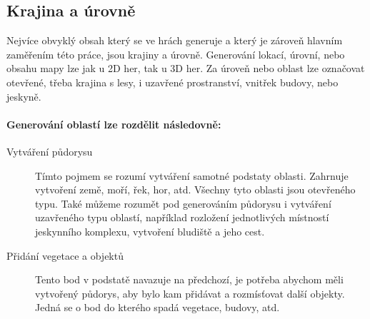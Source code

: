 \subsection{Krajina a úrovně}
Nejvíce obvyklý obsah který se ve hrách generuje a který je zároveň hlavním zaměřením této práce, jsou krajiny a úrovně. Generování lokací, úrovní, nebo obsahu mapy lze jak u 2D her, tak u 3D her. Za úroveň nebo oblast lze označovat otevřené, třeba krajina s lesy, i uzavřené prostranství, vnitřek budovy, nebo jeskyně. 

\paragraph*{Generování oblastí lze rozdělit následovně:}
\begin{description}
	\item[Vytváření půdorysu] Tímto pojmem se rozumí vytváření samotné podstaty oblasti. Zahrnuje vytvoření země, moří, řek, hor, atd. Všechny tyto oblasti jsou otevřeného typu. Také můžeme rozumět pod generováním půdorysu i vytváření uzavřeného typu oblastí, například rozložení jednotlivých místností jeskynního komplexu, vytvoření bludiště a jeho cest. 
	
	\item[Přidání vegetace a objektů] Tento bod v podstatě navazuje na předchozí, je potřeba abychom měli vytvořený půdorys, aby bylo kam přidávat a rozmísťovat další objekty. Jedná se o bod do kterého spadá vegetace, budovy, atd. 
	

\end{description}
